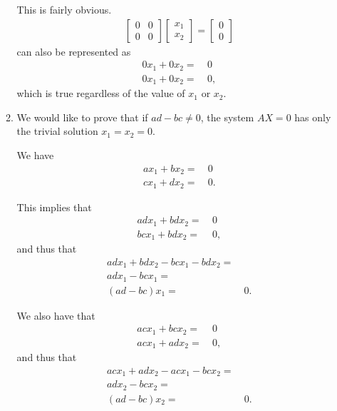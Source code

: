 \documentclass[12pt]{article}
\begin{document}
\begin{enumerate}
\begin{enumerate}
          This is fairly obvious.
          \begin{align*}
            \begin{bmatrix}
               0 & 0\\
               0 & 0
            \end{bmatrix}
            \begin{bmatrix}
               x_1 \\
               x_2
            \end{bmatrix}
            =
            \begin{bmatrix}
               0 \\
               0
            \end{bmatrix}
          \end{align*}
          can also be represented as
          \begin{align*}
            0x_1 + 0x_2 =&\ 0\\
            0x_1 + 0x_2 =&\ 0,
          \end{align*}
          which is true regardless of the value of $x_1$ or
          $x_2$.

        \item
          We would like to prove that if $ad - bc \neq 0$, the
          system $AX = 0$ has only the trivial solution $x_1 =
          x_2 = 0$.

          We have
          \begin{align*}
            ax_1 + bx_2 =&\ 0\\
            cx_1 + dx_2 =&\ 0.
          \end{align*}

          This implies that
          \begin{align*}
            adx_1 + bdx_2 =&\ 0\\
            bcx_1 + bdx_2 =&\ 0,
          \end{align*}
          and thus that
          \begin{align*}
            adx_1 + bdx_2 - bcx_1 - bdx_2 =&\\
            adx_1 - bcx_1 =&\\
            (ad - bc)x_1 =&\ 0.
          \end{align*}

          We also have that
          \begin{align*}
            acx_1 + bcx_2 =&\ 0\\
            acx_1 + adx_2 =&\ 0,
          \end{align*}
          and thus that
          \begin{align*}
            acx_1 + adx_2 - acx_1 - bcx_2 =&\\
            adx_2 - bcx_2 =&\\
            (ad - bc)x_2 =&\ 0.
          \end{align*}


\end{enumerate}
\end{enumerate}
\end{document}
